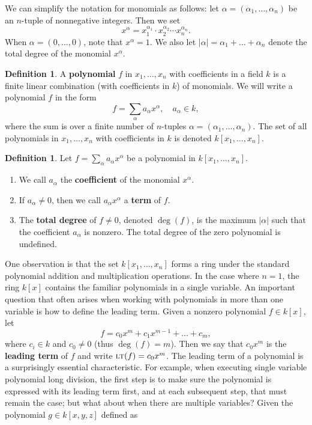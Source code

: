 \documentclass[MS, xcolor=dvipsnames]{wfuthesis}
\newcommand{\LT}{\ensuremath{\text{\sc lt}}}
\theoremstyle{definition}
\newtheorem{definition}[theorem]{Definition}
\begin{document}
We can simplify the notation for monomials as follows: let $\alpha = (\alpha_1,\dots,\alpha_n)$ be an $n$-tuple of nonnegative integers. Then we set
\[ x^\alpha = x_1^{\alpha_1} \cdot x_2^{\alpha_2} \cdots x_n^{\alpha_n}. \]
When $\alpha=(0,\dots,0)$, note that $x^\alpha=1$. We also let $|\alpha| = \alpha_1 + \dots + \alpha_n$ denote the total degree of the monomial $x^\alpha$.
\begin{definition}
  A \textbf{polynomial} $f$ in $x_1,\dots,x_n$ with coefficients in a field $k$ is a finite linear combination (with coefficients in $k$) of monomials. We will write a polynomial $f$ in the form
  \[ f = \sum_\alpha a_\alpha x^\alpha,\quad a_\alpha \in k, \]
  where the sum is over a finite number of $n$-tuples $\alpha = (\alpha_1,\dots,\alpha_n)$. The set of all polynomials in $x_1,\dots,x_n$ with coefficients in $k$ is denoted $k[x_1,\dots,x_n]$.
\end{definition}
\begin{definition}
  Let $f = \sum_\alpha a_\alpha x^\alpha$ be a polynomial in $k[x_1,\dots,x_n]$.
  \begin{enumerate}[label=(\roman*)]
    \item We call $a_\alpha$ the \textbf{coefficient} of the monomial $x^\alpha$.
    \item If $a_\alpha\ne0$, then we call $a_\alpha x^\alpha$ a \textbf{term} of $f$.
    \item The \textbf{total degree} of $f \ne 0$, denoted $\deg(f)$, is the maximum $|\alpha|$ such that the coefficient $a_\alpha$ is nonzero. The total degree of the zero polynomial is undefined.
  \end{enumerate}
\end{definition}
One observation is that the set $k[x_1,\dots,x_n]$ forms a ring under the standard polynomial addition and multiplication operations. In the case where $n=1$, the ring $k[x]$ contains the familiar polynomials in a single variable. An important question that often arises when working with polynomials in more than one variable is how to define the leading term. Given a nonzero polynomial $f \in k[x]$, let
\[ f = c_0x^m + c_1x^{m-1} + \dots + c_m, \]
where $c_i \in k$ and $c_0 \ne 0$ (thus $\deg(f)=m$). Then we say that $c_0x^m$ is the \textbf{leading term} of $f$ and write $\LT(f)=c_0x^m$. The leading term of a polynomial is a surprisingly essential characteristic. For example, when executing single variable polynomial long division, the first step is to make sure the polynomial is expressed with its leading term first, and at each subsequent step, that must remain the case; but what about when there are multiple variables? Given the polynomial $g \in k[x,y,z]$ defined as
\end{document}
